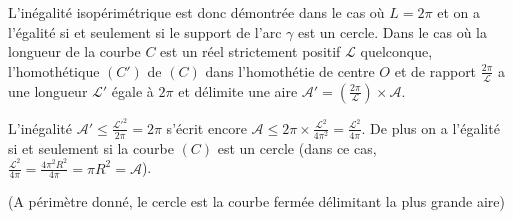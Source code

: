 {{L'inégalité isopérimétrique est donc démontrée dans le cas où $L=2\pi$ et on a l'égalité si et seulement si le support de l'arc $\gamma$ est un cercle. Dans le cas où la longueur de la courbe $C$ est un réel strictement positif $\mathcal{L}$ quelconque, l'homothétique $(C')$ de $(C)$ dans l'homothétie de centre $O$ et de rapport $ \frac{2\pi}{\mathcal{L}}$ a une longueur $\mathcal{L}'$ égale à $2\pi$ et délimite une aire $\mathcal{A}'=\left( \frac{2\pi}{\mathcal{L}}\right)\times\mathcal{A}$.

L'inégalité $\mathcal{A}'\leqslant \frac{\mathcal{L}'^2}{2\pi}=2\pi$ s'écrit encore $\mathcal{A}\leqslant2\pi\times \frac{\mathcal{L}^2}{4\pi^2}= \frac{\mathcal{L}^2}{4\pi}$. De plus on a l'égalité si et seulement si la courbe $(C)$ est un cercle (dans ce cas, $ \frac{\mathcal{L}^2}{4\pi}= \frac{4\pi^2R^2}{4\pi}=\pi R^2=\mathcal{A}$).

\begin{center}
\end{center}

(A périmètre donné, le cercle est la courbe fermée délimitant la plus grande aire)
}
}
